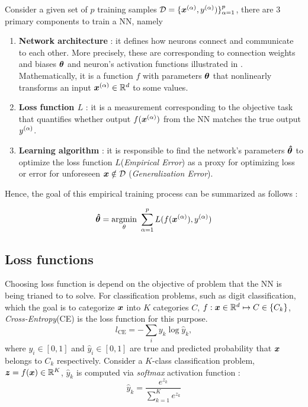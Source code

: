 Consider a given set of $p$ training samples $\mathcal{D} = \{ \xa, \ya) \}_{\alpha=1}^{p}$,  there are 3 primary components to train a NN, namely  
\begin{enumerate}
	\item \textbf{Network architecture} : it defines how neurons connect and communicate to each other. More precisely, these are corresponding to connection weights and biases $\patvector{\theta}$ and neuron's activation functions illustrated in \addfigure{\ref{fig:nn_typical_structure}}. Mathematically, it is a function $f$ with parameters $\patvector{\theta}$ that nonlinearly transforms an input $\xa\in \mathbb{R}^d $ to some values.
	\item \textbf{Loss function $L$} : it is a measurement corresponding to the objective task that quantifies whether output $f(\xa)$ from the NN matches the true output $y^{(\alpha)}$.
	\item \textbf{Learning algorithm} : it is responsible to find the network's parameters $\patvector{\hat{\theta}}$ to optimize the loss function $L$(\textit{Empirical Error})  as a proxy for optimizing loss or error for unforeseen $\boldsymbol{x} \notin \mathcal{D} $ (\textit{Generalization Error}). 
\end{enumerate}

Hence, the goal of this empirical training process can be summarized as follows : 

\begin{align}
	\patvector{\hat{\theta}} = \patarg{min}{\theta} \sum_{\alpha=1}^p L( f(\xa), \ya) 
\end{align}

\subsection{Loss functions}
Choosing loss function is depend on the objective of problem that the NN is being trianed to to solve. For classification problems, such as digit classification, which the goal is to categorize $\boldsymbol{x}$ into $K$ categories $C$, $f : \boldsymbol{x} \in \mathbb{R}^d  \mapsto C \in \{ C_k \}$, \textit{Cross-Entropy}(CE) is the loss function for this purpose.
$$
l_{\text{CE}} = - \sum_{i} y_k \log \hat{y}_k,
$$
where $y_i \in [0, 1]$ and $\hat{y}_i \in [0, 1]$ are true and predicted probability that $\boldsymbol{x}$ belongs to $C_k$ respectively. Consider a $K$-class classification problem, $\patvector{z} = f(\x) \in \mathbb{R}^{K}$, $\hat{y}_k$ is computed via \textit{softmax} activation function :
$$
\hat{y}_k = \frac{e^{z_k}}{ \sum_{k=1}^K{e^{z_k}} }
$$ 

